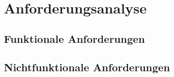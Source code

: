 \chapter{Anforderungsanalyse}

\section{Funktionale Anforderungen}

\section{Nichtfunktionale Anforderungen}